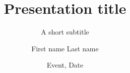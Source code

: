 \title[Short title]{Presentation title}
\subtitle{A short subtitle}
\author{First name Last name}
\date{Event, Date}
\titlegraphic{}
